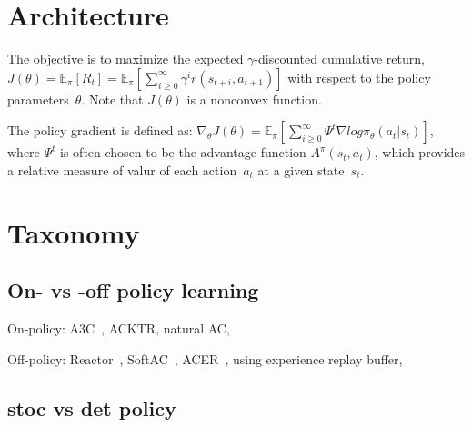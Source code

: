 \section{Architecture}







The objective is to
maximize the expected $\gamma$-discounted cumulative return,
$J(\theta) = \mathbb{E}_{\pi} [R_t] = \mathbb{E}_{\pi} [ \sum_{i \ge 0}^{\infty} \gamma^i r(s_{t+i}, a_{t+1}) ]$
with respect to the policy parameters~$\theta$.
Note that $J(\theta)$ is a nonconvex function.

The policy gradient is defined as:
$\nabla_{\theta} J(\theta) = \mathbb{E}_{\pi} [ \sum_{i \ge 0}^{\infty} \Psi^t \nabla log \pi_{\theta} (a_t | s_t) ]$,
where $\Psi^t$ is often chosen to be the advantage function $A^{\pi}(s_t,a_t)$,
which provides a relative measure of valur of each action~$a_t$ at a given state~$s_t$.

\section{Taxonomy}

\subsection{On- vs -off policy learning}
On-policy:
A3C~\cite{Mnih2016},
ACKTR,
natural AC,

Off-policy:
Reactor~\cite{Gruslys2018},
SoftAC~\cite{Haarnoja2017},
ACER~\cite{Wang2016},
using experience replay buffer,

\subsection{stoc vs det policy}
